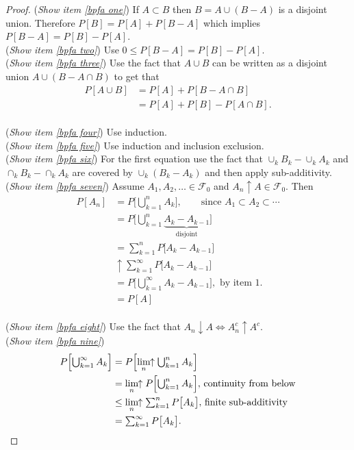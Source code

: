 \begin{proof}
\textbullet({\sl Show item \ref{bpfa one}}) If $A\subset B$ then $B = A \cup (B-A)$ is a disjoint union. Therefore $P[B] = P[A] + P[B-A]$ which implies $P[B-A]=P[B]-P[A]$.
\\
\textbullet({\sl Show item \ref{bpfa two}}) Use $0\leq P[B-A]=P[B]-P[A]$.
\\
\textbullet({\sl Show item \ref{bpfa three}}) Use the fact that $A\cup B$ can be written as a disjoint union ${A \cup (B-A\cap B)}$ to get that
\begin{align*}
P[A\cup B]&= P[A] + P[B-A\cap B] \\
&= P[A] + P[B] - P[A\cap B].
\end{align*}
\\
\textbullet({\sl Show item \ref{bpfa four}}) Use induction.
\\
\textbullet({\sl Show item \ref{bpfa five}}) Use induction and inclusion exclusion.
\\
\textbullet({\sl Show item \ref{bpfa six}})
For the first equation use the fact that $\cup_k B_k - \cup_k A_k$ and $\cap_k B_k - \cap_k A_k$  are covered by $\cup_k(B_k - A_k)$ and then apply sub-additivity.
\\
\textbullet({\sl Show item \ref{bpfa seven}})
Assume $A_1, A_2, \ldots \in \mathcal F_0$ and $A_n\uparrow A\in\mathcal F_0$. Then
 \begin{align*}
 P[A_n] &= P\big[ \textstyle\bigcup_{k=1}^n A_k \big],\qquad\text{since $A_1\subset A_2\subset \cdots$}\\
 &= P\big[ \textstyle\bigcup_{k=1}^n \underbrace{A_k - A_{k-1}}_{\text{disjoint}} \big] \\
 &= \textstyle\sum_{k=1}^nP\big[ A_k - A_{k-1} \big] \\
 &\uparrow \textstyle\sum_{k=1}^\infty P\big[ A_k - A_{k-1}\big] \\
 &=P\big[ \textstyle\bigcup_{k=1}^\infty  A_k - A_{k-1} \big],\,\,\text{by item 1.}\\
 &=P[ A ]
 \end{align*}
 \\
\textbullet({\sl Show item \ref{bpfa eight}})
Use the fact that $A_n\downarrow A \Longleftrightarrow A_n^c \uparrow A^c$.
\\
\textbullet({\sl Show item \ref{bpfa nine}})
 \begin{align*}
  P\Bigl[\textstyle\bigcup_{k=1}^\infty A_k \Bigr]
  & =  P\Bigl[\displaystyle\lim_{n}\!\!\uparrow\textstyle\bigcup_{k=1}^n A_k \Bigr] \\
  & =  \displaystyle\lim_{n}\!\!\uparrow P\Bigl[\textstyle\bigcup_{k=1}^n A_k \Bigr],\,\text{continuity from below}\\
  & \leq  \displaystyle\lim_{n}\!\!\uparrow \textstyle\sum_{k=1}^n P\bigl[A_k \bigr],\,\text{finite sub-additivity}\\
  & =  \textstyle\sum_{k=1}^\infty P\bigl[A_k \bigr].
 \end{align*}
\end{proof}



